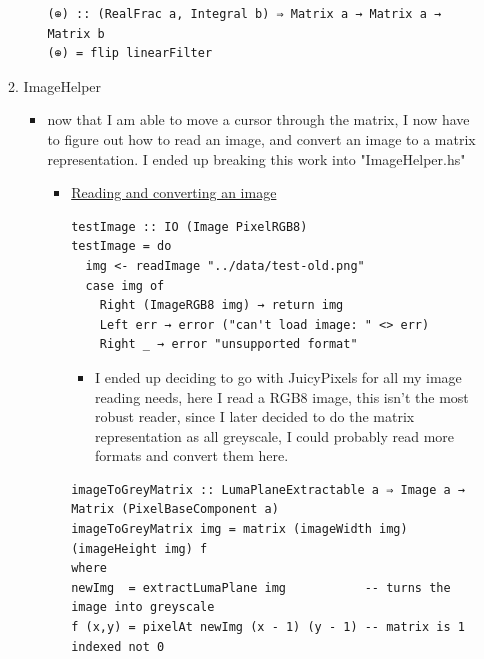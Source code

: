 \documentclass{article}
\begin{document}
\begin{enumerate}
\begin{enumerate}
\begin{itemize}
\begin{verbatim}
(⊕) :: (RealFrac a, Integral b) ⇒ Matrix a → Matrix a → Matrix b
(⊕) = flip linearFilter
\end{verbatim}
\end{itemize}
\item ImageHelper
\label{sec-2-1-2}
\begin{itemize}
\item now that I am able to move a cursor through the matrix, I now have
to figure out how to read an image, and convert an image to a matrix
representation. I ended up breaking this work into "ImageHelper.hs"
\begin{itemize}
\item \uline{Reading and converting an image}
\begin{verbatim}
testImage :: IO (Image PixelRGB8)
testImage = do
  img <- readImage "../data/test-old.png"
  case img of
    Right (ImageRGB8 img) → return img
    Left err → error ("can't load image: " <> err)
    Right _ → error "unsupported format"
\end{verbatim}
\begin{itemize}
\item Ι ended up deciding to go with JuicyPixels for all my image
reading needs, here Ι read a RGB8 image, this isn't the most
robust reader, since I later decided to do the matrix
representation as all greyscale, I could probably read more
formats and convert them here.
\end{itemize}
\begin{verbatim}
imageToGreyMatrix :: LumaPlaneExtractable a ⇒ Image a → Matrix (PixelBaseComponent a)
imageToGreyMatrix img = matrix (imageWidth img) (imageHeight img) f
where
newImg  = extractLumaPlane img           -- turns the image into greyscale
f (x,y) = pixelAt newImg (x - 1) (y - 1) -- matrix is 1 indexed not 0


\end{verbatim}
\end{itemize}
\end{itemize}
\end{enumerate}
\end{enumerate}
\end{document}

